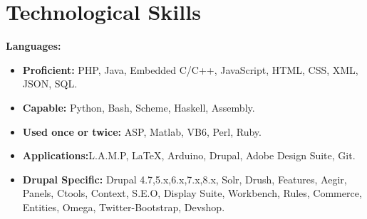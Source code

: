 \documentclass[]{friggeri-cv} %
\begin{document}
\newpage

\section{Technological Skills}
\textbf{Languages:}
\begin{itemize}
\item \textbf{Proficient: }PHP, Java, Embedded C/C++, JavaScript, HTML, CSS, XML, JSON, SQL.
\item \textbf{Capable: }Python, Bash, Scheme, Haskell, Assembly.
\item \textbf{Used once or twice: }ASP, Matlab, VB6, Perl, Ruby.
\item \textbf{Applications:}L.A.M.P, \LaTeX, Arduino, Drupal, Adobe Design Suite, Git.
\item \textbf{Drupal Specific: } Drupal 4.7,5.x,6.x,7.x,8.x, Solr, Drush, Features, Aegir, Panels, Ctools, Context, S.E.O, Display Suite, Workbench, Rules, Commerce, Entities, Omega, Twitter-Bootstrap, Devshop.
\end{itemize}

\end{document}
